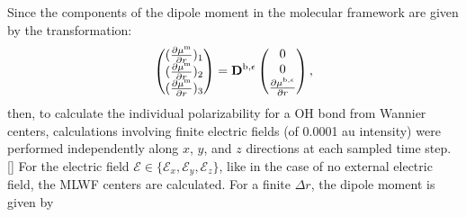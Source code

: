         Since the components of the dipole moment in the molecular framework are given by the transformation:
        \begin{subequations}
          \begin{align}
            \left(
            \begin{matrix}
              (\frac{\partial \mu^\text{m}}{\partial r})_1\\
              (\frac{\partial \mu^\text{m}}{\partial r})_2\\
              (\frac{\partial \mu^\text{m}}{\partial r})_3
            \end{matrix}
            \right)
            = {\bf D}^{\text{b},\epsilon}
            \left(
            \begin{matrix}
              0\\
              0\\
              \frac{\partial \mu^{\text{b},\epsilon}}{\partial r}
            \end{matrix}
            \right),
            \end{align}
        \end{subequations}
    then, to calculate the individual polarizability for a OH bond from Wannier centers, 
    calculations involving finite electric fields (of 0.0001 au intensity) were performed independently 
    along $x$, $y$, and $z$ directions at each sampled time step. [\cite{sulpizi2013}]
    For the electric field $\mathscr{E} \in \{\mathscr{E}_x,\mathscr{E}_y, \mathscr{E}_z\}$,
       like in the case of no external electric field, the MLWF centers are calculated. %
 For a finite $\Delta r$, the dipole moment is given by 
